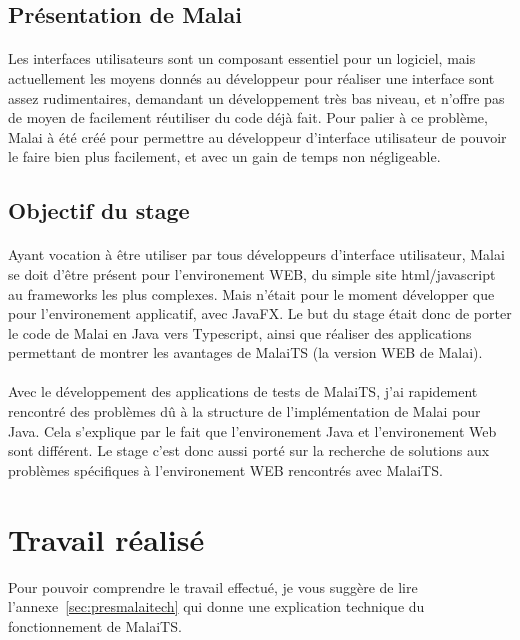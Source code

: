 \documentclass[11pt, a4paper, pdftex]{article}
\begin{document}
        \subsection{Présentation de Malai}\label{subsec:premal}
            \paragraph{}
                Les interfaces utilisateurs sont un composant essentiel pour un logiciel, mais actuellement les moyens donnés au développeur pour réaliser
                une interface sont assez rudimentaires, demandant un développement très bas niveau, et n'offre pas de moyen de facilement réutiliser du code déjà fait.
                Pour palier à ce problème, Malai à été créé pour permettre au développeur d'interface utilisateur de pouvoir le faire bien plus facilement, et avec un gain de temps non négligeable.
    \vspace{1cm}
        \subsection{Objectif du stage}\label{subsec:objsta}
            \paragraph{}
                Ayant vocation à être utiliser par tous développeurs d'interface utilisateur, Malai se doit d'être présent pour l'environement WEB, du simple site html/javascript au frameworks les plus complexes.
                Mais n'était pour le moment développer que pour l'environement applicatif, avec JavaFX. Le but du stage était donc de porter le code de Malai en Java
                vers Typescript, ainsi que réaliser des applications permettant de montrer les avantages de MalaiTS (la version WEB de Malai).
            \paragraph{}
                Avec le développement des applications de tests de MalaiTS, j'ai rapidement rencontré des problèmes dû à la structure de l'implémentation de Malai pour Java.
                Cela s'explique par le fait que l'environement Java et l'environement Web sont différent.
                Le stage c'est donc aussi porté sur la recherche de solutions aux problèmes spécifiques à l'environement WEB rencontrés avec MalaiTS\@.
    \newpage
    \section{Travail réalisé}\label{sec:trarea}
        Pour pouvoir comprendre le travail effectué, je vous suggère de lire l'annexe~\ref{sec:presmalaitech} qui donne une explication technique du fonctionnement de MalaiTS\@.
\end{document}
